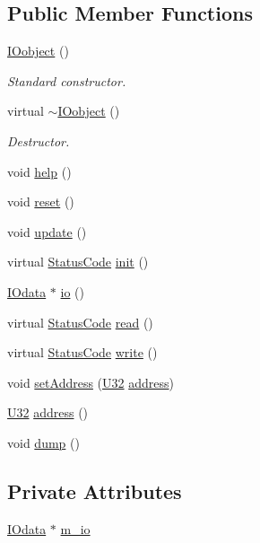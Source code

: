 \subsection*{Public Member Functions}
\begin{DoxyCompactItemize}
\item 
\hyperlink{classIOobject_a0c3f5a9fcc09892e99a4c977f4318a0b}{I\+Oobject} ()
\begin{DoxyCompactList}\small\item\em Standard constructor. \end{DoxyCompactList}\item 
virtual \hyperlink{classIOobject_a1db3f3f5d07a00a0b4cd47b2a0222f84}{$\sim$\+I\+Oobject} ()
\begin{DoxyCompactList}\small\item\em Destructor. \end{DoxyCompactList}\item 
void \hyperlink{classIOobject_a0520d82a9773c764fbaede59fe6f8a17}{help} ()
\item 
void \hyperlink{classIOobject_abccbc7a65366ec1257ff41a8e3245af8}{reset} ()
\item 
void \hyperlink{classIOobject_a0100b4ddcfe8f0b551a3f0dc5201988d}{update} ()
\item 
virtual \hyperlink{classStatusCode}{Status\+Code} \hyperlink{classIOobject_ab989e175734dd73797343e63cec6b174}{init} ()
\item 
\hyperlink{classIOdata}{I\+Odata} $\ast$ \hyperlink{classIOobject_af04fb94137c3d86849f478ac5afab5d1}{io} ()
\item 
virtual \hyperlink{classStatusCode}{Status\+Code} \hyperlink{classIOobject_aa07610c11963b1db6710e3c76ceea456}{read} ()
\item 
virtual \hyperlink{classStatusCode}{Status\+Code} \hyperlink{classIOobject_a9f6984bc9f0fadcf800f1be2523ac744}{write} ()
\item 
void \hyperlink{classIOobject_ae0d372aaeafe3da3c239677118deb2ac}{set\+Address} (\hyperlink{classIOobject_ad5bc21e44080074fe1068dc83861a090}{U32} \hyperlink{classIOobject_a95f0d3f092ea1ae3037ac60f0674d095}{address})
\item 
\hyperlink{classIOobject_ad5bc21e44080074fe1068dc83861a090}{U32} \hyperlink{classIOobject_a95f0d3f092ea1ae3037ac60f0674d095}{address} ()
\item 
void \hyperlink{classIOobject_a1247f08c84c1732a76caf07e987871e9}{dump} ()
\end{DoxyCompactItemize}
\subsection*{Private Attributes}
\begin{DoxyCompactItemize}
\item 
\hyperlink{classIOdata}{I\+Odata} $\ast$ \hyperlink{classIOobject_aa648e4128c3c37d8291d6bb26b57c504}{m\+\_\+io}
\end{DoxyCompactItemize}

